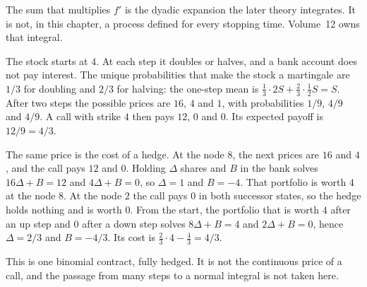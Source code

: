 The sum that multiplies $f'$ is the dyadic expansion the later theory integrates. It is not, in this chapter, a process defined for every stopping time. Volume~12 owns that integral.

\begin{examplex}
The stock starts at $4$. At each step it doubles or halves, and a bank account does not pay interest. The unique probabilities that make the stock a martingale are $1/3$ for doubling and $2/3$ for halving: the one-step mean is $\frac13\cdot 2S+\frac23\cdot\frac12 S=S$. After two steps the possible prices are $16$, $4$ and $1$, with probabilities $1/9$, $4/9$ and $4/9$. A call with strike $4$ then pays $12$, $0$ and $0$. Its expected payoff is $12/9=4/3$.

The same price is the cost of a hedge. At the node $8$, the next prices are $16$ and $4$, and the call pays $12$ and $0$. Holding $\Delta$ shares and $B$ in the bank solves $16\Delta+B=12$ and $4\Delta+B=0$, so $\Delta=1$ and $B=-4$. That portfolio is worth $4$ at the node $8$. At the node $2$ the call pays $0$ in both successor states, so the hedge holds nothing and is worth $0$. From the start, the portfolio that is worth $4$ after an up step and $0$ after a down step solves $8\Delta+B=4$ and $2\Delta+B=0$, hence $\Delta=2/3$ and $B=-4/3$. Its cost is $\frac23\cdot4-\frac43=4/3$.

This is one binomial contract, fully hedged. It is not the continuous price of a call, and the passage from many steps to a normal integral is not taken here.
\end{examplex}

